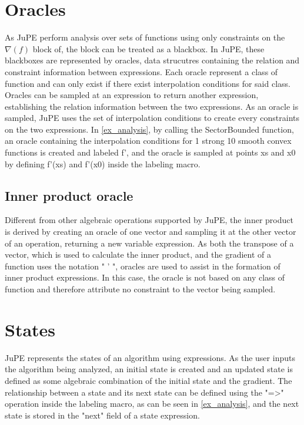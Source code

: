 \section{Oracles}
As JuPE perform analysis over sets of functions using only constraints on the \( \nabla (f) \) block of, the block can be treated as a blackbox. In JuPE, these blackboxes are represented by oracles, data strucutres containing the relation and constraint information between expressions. Each oracle represent a class of function and can only exist if there exist interpolation conditions for said class. Oracles can be sampled at an expression to return another expression, establishing the relation information between the two expressions. As an oracle is sampled, JuPE uses the set of interpolation conditions to create every constraints on the two expressions.  In \ref{ex_analysis}, by calling the SectorBounded function, an oracle containing the interpolation conditions for 1 strong 10 smooth convex functions is created and labeled f', and the oracle is sampled at points xs and x0 by defining f'(xs) and f'(x0) inside the labeling macro.

\subsection*{Inner product oracle}
Different from other algebraic operations supported by JuPE, the inner product is derived by creating an oracle of one vector and sampling it at the other vector of an operation, returning a new variable expression. As both the transpose of a vector, which is used to calculate the inner product, and the gradient of a function uses the notation " ' ", oracles are used to assist in the formation of inner product expressions. In this case, the oracle is not based on any class of function and therefore attribute no constraint to the vector being sampled.

\section{States}
JuPE represents the states of an algorithm using expressions. As the user inputs the algorithm being analyzed, an initial state is created and an updated state is defined as some algebraic combination of the initial state and the gradient. The relationship between a state and its next state can be defined using the "=>" operation inside the labeling macro, as can be seen in \ref{ex_analysis}, and the next state is stored in the "next" field of a state expression.

